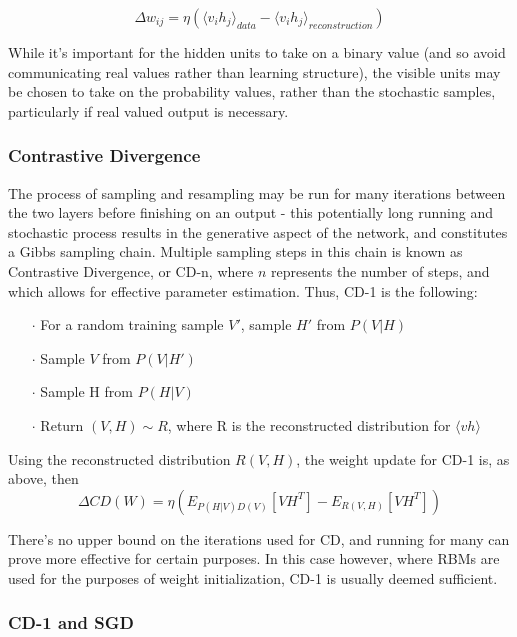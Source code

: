 \documentclass[a4paper,latin]{paper}
\begin{document}
\begin{equation}
\Delta w_{ij} = \eta (\langle v_ih_j\rangle_{data} - \langle v_ih_j\rangle_{reconstruction})
\end{equation}

While it's important for the hidden units to take on a binary value (and so avoid communicating real values rather than learning structure), the visible units may be chosen to take on the probability values, rather than the stochastic samples, particularly if real valued output is necessary. 

\subsubsection{Contrastive Divergence}\label{imp_CD}

The process of sampling and resampling may be run for many iterations between the two layers before finishing on an output - this potentially long running and stochastic process results in the generative aspect of the network, and constitutes a Gibbs sampling chain. Multiple sampling steps in this chain is known as Contrastive Divergence, or CD-n, where $n$ represents the number of steps, and which allows for effective parameter estimation. Thus, CD-1 is the following:

\begin{itemize}
	\item [$\cdot$] For a random training sample $V'$, sample $H'$ from $P(V|H)$
	\item [$\cdot$] Sample $V$ from $P(V|H')$
	\item [$\cdot$] Sample H from $P(H|V)$
	\item [$\cdot$] Return $(V,H) \sim R $, where R is the reconstructed distribution for $\langle vh \rangle$
\end{itemize}

Using the reconstructed distribution $R(V,H)$, the weight update for CD-1 is, as above, then 
\begin{equation}
\Delta CD(W) = \eta( E_{P(H|V)D(V)}[VH^T] - E_{R(V,H)}[VH^T])
\end{equation}

There's no upper bound on the iterations used for CD, and running for many can prove more effective for certain purposes. In this case however, where RBMs are used for the purposes of weight initialization, CD-1 is usually deemed sufficient.

\subsubsection{CD-1 and SGD}
\end{document}
